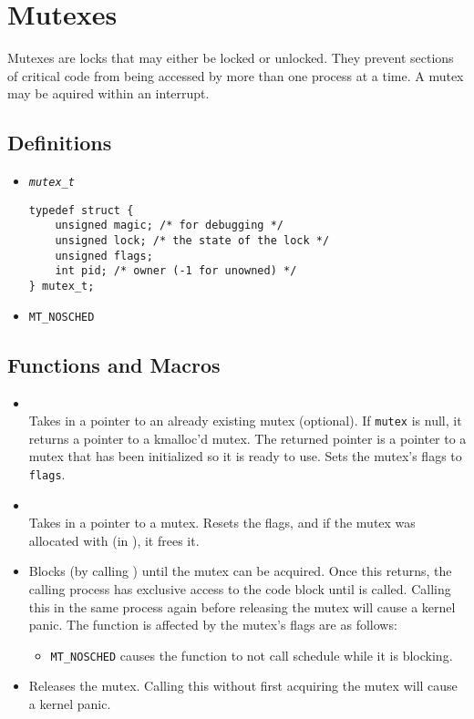 \section{Mutexes}

Mutexes are locks that may either be locked or unlocked. They prevent sections of
critical code from being accessed by more than one process at a time. A mutex may
be aquired within an interrupt.

\subsection{Definitions}
\begin{itemize}

\item \texttt{\textit{mutex\_t}} 
\begin{lstlisting}
typedef struct {
	unsigned magic; /* for debugging */
	unsigned lock; /* the state of the lock */
	unsigned flags;
	int pid; /* owner (-1 for unowned) */
} mutex_t;
\end{lstlisting}

\item \texttt{MT\_NOSCHED}

\end{itemize}

\subsection{Functions and Macros}
\begin{itemize}
\item {} \\
Takes in a pointer to an already existing mutex (optional). If \texttt{mutex} is 
null, it returns a pointer to a kmalloc'd mutex. The returned pointer
is a pointer to a mutex that has been initialized so it is ready to use. Sets the mutex's flags
to \texttt{flags}.

\item {} \\
Takes in a pointer to a mutex. Resets the flags, and if the mutex was allocated
with  (in ), it frees it.
\item {} 
Blocks (by calling ) until the mutex can be acquired. Once this returns,
the calling process has exclusive access to the code block until  is called.
Calling this in the same process again before releasing the mutex will cause a kernel panic.
The function is affected by the mutex's flags are as follows:
\begin{itemize}
\item \texttt{MT\_NOSCHED} causes the function to not call schedule while it is blocking.
\end{itemize}
\item {} 
Releases the mutex. Calling this without first acquiring the mutex will cause a kernel panic.
\end{itemize}
